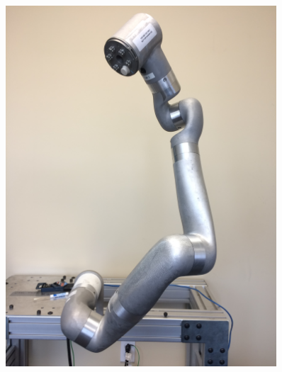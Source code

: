 \begin{figure}
\begin{minipage}{.5\textwidth}
		\label{fig:pose6}
	\end{minipage}
\end{figure}

\begin{figure}
	\centering
	\begin{minipage}{.5\textwidth}
		\centering
		\includegraphics[width=0.9\textwidth]{./images/Pose7}
		\label{fig:pose7}
	\end{minipage}%
	\begin{minipage}{.5\textwidth}
		\centering

\end{minipage}
\end{figure}
